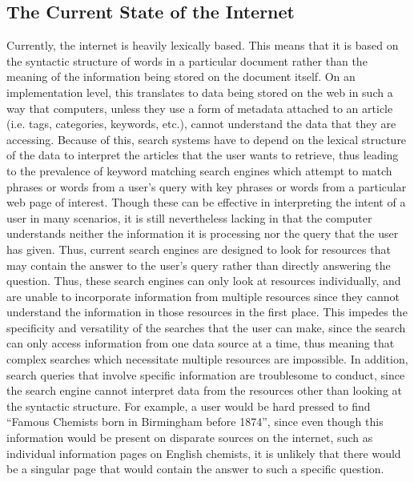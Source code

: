 \documentclass[12pt]{article}
\begin{document}
	\subsection{The Current State of the Internet}
	\quad Currently, the internet is heavily lexically based. This means that it is based on the syntactic structure of words in a particular document rather than the meaning of the information being stored on the document itself. On an implementation level, this translates to data being stored on the web in such a way that computers, unless they use a form of metadata attached to an article (i.e. tags, categories, keywords, etc.), cannot understand the data that they are accessing. Because of this, search systems have to depend on the lexical structure of the data to interpret the articles that the user wants to retrieve, thus leading to the prevalence of keyword matching search engines which attempt to match phrases or words from a user’s query with key phrases or words from a particular web page of interest. Though these can be effective in interpreting the intent of a user in many scenarios, it is still nevertheless lacking in that the computer understands neither the information it is processing nor the query that the user has given. Thus, current search engines are designed to look for resources that may contain the answer to the user’s query rather than directly answering the question. Thus, these search engines can only look at resources individually, and are unable to incorporate information from multiple resources since they cannot understand the information in those resources in the first place. This impedes the specificity and versatility of the searches that the user can make, since the search can only access information from one data source at a time, thus meaning that complex searches which necessitate multiple resources are impossible. In addition, search queries that involve specific information are troublesome to conduct, since the search engine cannot interpret data from the resources other than looking at the syntactic structure. For example, a user would be hard pressed to find “Famous Chemists born in Birmingham before 1874”, since even though this information would be present on disparate sources on the internet, such as individual information pages on English chemists, it is unlikely that there would be a singular page that would contain the answer to such a specific question.
\end{document}
